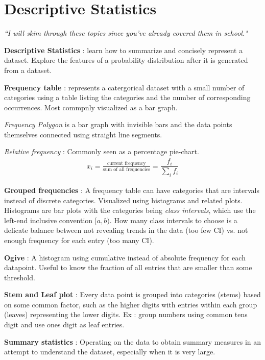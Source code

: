 \chapter{Descriptive Statistics}


\begin{flushright}
	\textit{``I will skim through these topics since you've already covered them in school."} 
\end{flushright}

\textbf{Descriptive Statistics} : learn how to summarize and concisely represent a dataset. Explore the features of a probability distribution after it is generated from a dataset.

\textbf{Frequency table} : represents a catergorical dataset with a small number of categories using a table listing the categories and the number of corresponding occurrences. Most commpnly visualized as a bar graph.

\textit{Frequency Polygon} is a bar graph with invisible bars and the data points themselves connected using straight line segments.

\textit{Relative frequency} : Commonly seen as a percentage pie-chart. 
	\begin{align}
	x_{i} = \frac{\text{current frequency}}{\text{sum of all frequencies}} = \dfrac{f_{i}}{ \sum_{i} f_{i}} 
	\end{align}

\textbf{Grouped frequencies} : A frequency table can have categories that are intervals instead of discrete categories. Visualized using histograms and related plots. Histograms are bar plots with the categories being \textit{class intervals}, which use the left-end inclusive convention $[a, b)$. How many class intervals to choose is a delicate balance between not revealing trends in the data (too few CI) vs. not enough frequency for each entry (too many CI).

\textbf{Ogive} : A histogram using cumulative instead of absolute frequency for each datapoint. Useful to know the fraction of all entries that are smaller than some threshold.

\textbf{Stem and Leaf plot} : Every data point is grouped into categories (stems) based on some common factor, such as the higher digits with entries within each group (leaves) representing the lower digits. Ex : group numbers using common tens digit and use ones digit as leaf entries.

\textbf{Summary statistics} : Operating on the data to obtain summary measures in an attempt to understand the dataset, especially when it is very large.

